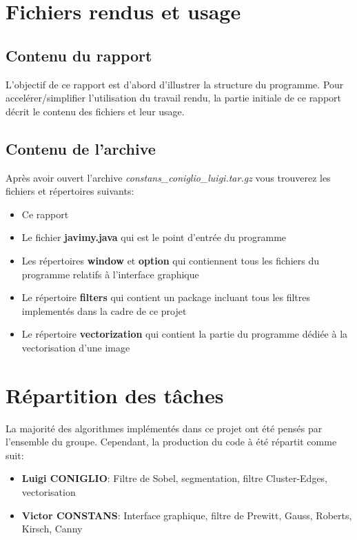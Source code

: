 \documentclass[twoside,openright,a4paper,11pt,french]{article}
\begin{document}
\pagestyle{plain}
\setlength{\parindent}{0pt}



\parskip=0pt
\tableofcontents


\vspace{5cm}


\section{Fichiers rendus et usage}
\subsection{Contenu du rapport}
L'objectif de ce rapport est d'abord d'illustrer la structure du
programme. Pour accelérer/simplifier l'utilisation du travail rendu, la partie
initiale de ce rapport décrit le contenu des fichiers et leur usage.

\subsection{Contenu de l'archive}
Après avoir ouvert l'archive {\it constans\_coniglio\_luigi.tar.gz} vous
trouverez les fichiers et répertoires suivants:
\smallbreak
\begin{itemize}
\item Ce rapport
\item Le fichier {\bf javimy.java} qui est le point d'entrée du programme
\item Les répertoires {\bf window} et {\bf option} qui contiennent tous les fichiers du programme relatifs
      à l'interface graphique
\item Le répertoire {\bf filters} qui contient un package incluant tous les filtres 
      implementés dans la cadre de ce projet
\item Le répertoire {\bf vectorization} qui contient la partie du programme dédiée à
      la vectorisation d'une image
\end{itemize}

\section{Répartition des tâches}
La majorité des algorithmes implémentés dans ce projet ont été pensés par l'ensemble du groupe.
Cependant, la production du code à été répartit comme suit:
\begin{itemize}
\item {\bf Luigi CONIGLIO}: Filtre de Sobel, segmentation, filtre Cluster-Edges, vectorisation
\item {\bf Victor CONSTANS}: Interface graphique, filtre de Prewitt, Gauss, Roberts, Kirsch, Canny
\end{itemize}
\end{document}
